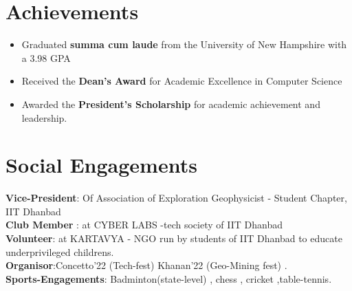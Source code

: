 \documentclass[letterpaper,11pt]{article}
\begin{document}
\section{Achievements}
\begin{itemize} %
    \item Graduated \textbf{summa cum laude} from the University of New Hampshire with a 3.98 GPA
    \item Received the \textbf{Dean's Award} for Academic Excellence in Computer Science
    \item Awarded the \textbf{President's Scholarship} for academic achievement and leadership.
\end{itemize} %

\section{Social Engagements}
    \begin{itemize}[leftmargin=0.15in, label={}]
	\small{\item{
		\textbf{Vice-President}{: Of Association of Exploration Geophysicist - Student Chapter, IIT Dhanbad} \\
		\textbf{Club Member}{ : at CYBER LABS -tech society of IIT Dhanbad } \\
		\textbf{Volunteer}{: at KARTAVYA - NGO run by students of IIT Dhanbad to educate underprivileged childrens.} \\
  		\textbf{Organisor}{:Concetto'22 (Tech-fest)  Khanan'22 (Geo-Mining fest) .} \\
        \textbf{Sports-Engagements}{: Badminton(state-level) , chess , cricket ,table-tennis.}
	}}
    \end{itemize}


\end{document}
